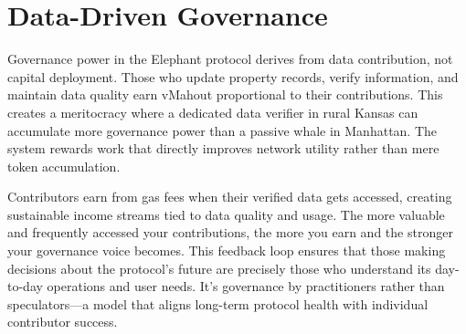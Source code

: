 \section{Data-Driven Governance}

Governance power in the Elephant protocol derives from data contribution, not capital deployment. Those who update property records, verify information, and maintain data quality earn vMahout proportional to their contributions. This creates a meritocracy where a dedicated data verifier in rural Kansas can accumulate more governance power than a passive whale in Manhattan. The system rewards work that directly improves network utility rather than mere token accumulation.

Contributors earn from gas fees when their verified data gets accessed, creating sustainable income streams tied to data quality and usage. The more valuable and frequently accessed your contributions, the more you earn and the stronger your governance voice becomes. This feedback loop ensures that those making decisions about the protocol's future are precisely those who understand its day-to-day operations and user needs. It's governance by practitioners rather than speculators---a model that aligns long-term protocol health with individual contributor success.

